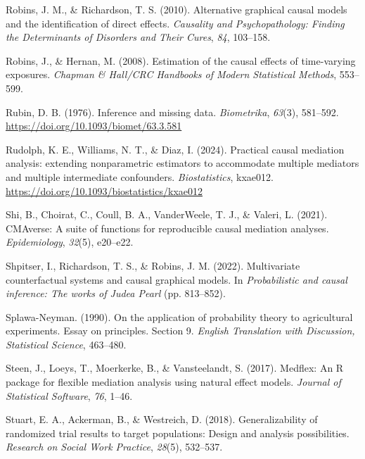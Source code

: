 \documentclass[
  single column]{article}
\newlength{\cslhangindent}
\newenvironment{CSLReferences}[2] %
 {\begin{list}{}{%
  \setlength{\itemindent}{0pt}
  \setlength{\leftmargin}{0pt}
  \setlength{\parsep}{0pt}
  \ifodd #1
   \setlength{\leftmargin}{\cslhangindent}
   \setlength{\itemindent}{-1\cslhangindent}
  \fi
  \setlength{\itemsep}{#2\baselineskip}}}
 {\end{list}}
\begin{document}
\begin{CSLReferences}{1}{0}
Robins, J. M., \& Richardson, T. S. (2010). Alternative graphical causal
models and the identification of direct effects. \emph{Causality and
Psychopathology: Finding the Determinants of Disorders and Their Cures},
\emph{84}, 103--158.

Robins, J., \& Hernan, M. (2008). Estimation of the causal effects of
time-varying exposures. \emph{Chapman \& Hall/CRC Handbooks of Modern
Statistical Methods}, 553--599.

Rubin, D. B. (1976). Inference and missing data. \emph{Biometrika},
\emph{63}(3), 581--592. \url{https://doi.org/10.1093/biomet/63.3.581}

Rudolph, K. E., Williams, N. T., \& Diaz, I. (2024). {Practical causal
mediation analysis: extending nonparametric estimators to accommodate
multiple mediators and multiple intermediate confounders}.
\emph{Biostatistics}, kxae012.
\url{https://doi.org/10.1093/biostatistics/kxae012}

Shi, B., Choirat, C., Coull, B. A., VanderWeele, T. J., \& Valeri, L.
(2021). CMAverse: A suite of functions for reproducible causal mediation
analyses. \emph{Epidemiology}, \emph{32}(5), e20--e22.

Shpitser, I., Richardson, T. S., \& Robins, J. M. (2022). Multivariate
counterfactual systems and causal graphical models. In
\emph{Probabilistic and causal inference: The works of {J}udea {P}earl}
(pp. 813--852).

Splawa-Neyman. (1990). On the application of probability theory to
agricultural experiments. Essay on principles. Section 9. \emph{English
Translation with Discussion, Statistical Science}, 463--480.

Steen, J., Loeys, T., Moerkerke, B., \& Vansteelandt, S. (2017).
Medflex: An {R} package for flexible mediation analysis using natural
effect models. \emph{Journal of Statistical Software}, \emph{76}, 1--46.

Stuart, E. A., Ackerman, B., \& Westreich, D. (2018). Generalizability
of randomized trial results to target populations: Design and analysis
possibilities. \emph{Research on Social Work Practice}, \emph{28}(5),
532--537.


\end{CSLReferences}
\end{document}
